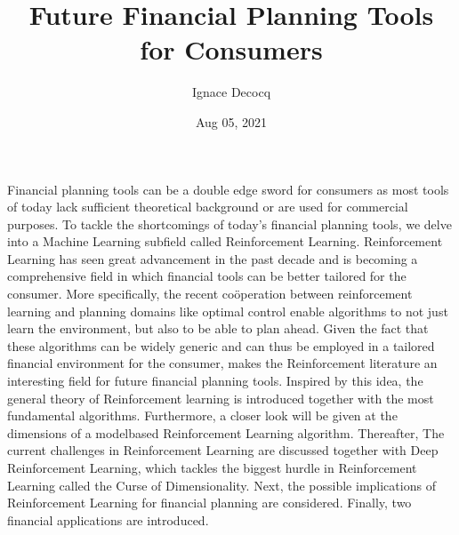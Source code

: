 \documentclass[letterpaper,10pt,english]{jupyterBook}
\title{Future Financial Planning Tools for Consumers}
\date{Aug 05, 2021}
\author{Ignace Decocq}
\begin{document}
\pagestyle{empty}
\sphinxmaketitle
\pagestyle{plain}
\sphinxtableofcontents
\pagestyle{normal}
\label{\detokenize{abstract::doc}}


\sphinxAtStartPar
Financial planning tools can be a double edge sword for consumers as most tools of today lack sufficient theoretical background or are used for commercial purposes. To tackle the shortcomings of today’s financial planning tools, we delve into a Machine Learning subfield called Reinforcement Learning. Reinforcement Learning has seen great advancement in the past decade and is becoming a comprehensive field in which financial tools can be better tailored for the consumer. More specifically, the recent coöperation between reinforcement learning and planning domains like optimal control enable algorithms to not just learn the environment, but also to be able to plan ahead. Given the fact that these algorithms can be widely generic and can thus be employed in a tailored financial environment for the consumer, makes the Reinforcement literature an interesting field for future financial planning tools. Inspired by this idea, the general theory of Reinforcement learning is introduced together with the most fundamental algorithms. Furthermore, a closer look will be given at the dimensions of a model\sphinxhyphen{}based Reinforcement Learning algorithm. Thereafter, The current challenges in Reinforcement Learning are discussed together with Deep Reinforcement Learning, which tackles the biggest hurdle in Reinforcement Learning called the Curse of Dimensionality. Next, the possible implications of Reinforcement Learning for financial planning are considered. Finally, two financial applications are introduced.
\end{document}

